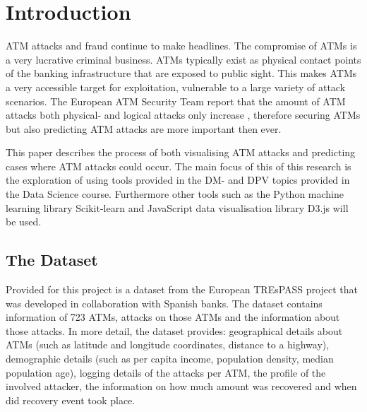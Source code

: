 \documentclass[conference]{IEEEtran}
\begin{document}




%
\IEEEpeerreviewmaketitle



\section{Introduction} \label{introduction}

ATM attacks and fraud continue to make headlines. The compromise of ATMs is a very lucrative criminal business. ATMs typically exist as physical contact points of the banking infrastructure that are exposed to public sight. This makes ATMs a very accessible target for exploitation, vulnerable to a large variety of attack scenarios. The European ATM Security Team report that the amount of ATM attacks both physical- and logical attacks only increase \cite{c1}, therefore securing ATMs but also predicting ATM attacks are more important then ever.

This paper describes the process of both visualising ATM attacks and predicting cases where ATM attacks could occur. The main focus of this of this research is the exploration of using tools provided in the DM- and DPV topics provided in the Data Science course. Furthermore other tools such as the Python machine learning library Scikit-learn and JavaScript data visualisation library D3.js will be used.

\subsection{The Dataset}
Provided for this project is a dataset from the European TREsPASS project  \cite{c2} that was developed in collaboration with Spanish banks. The dataset contains information of 723 ATMs, attacks on those ATMs and the information about those attacks. In more detail, the dataset provides: geographical details about ATMs (such as latitude and longitude coordinates, distance to a highway), demographic details (such as per capita income, population density, median population age), logging details of the attacks per ATM, the profile of the involved attacker, the information on how much amount was recovered and when did recovery event took place.
\end{document}
